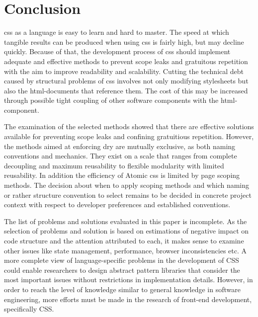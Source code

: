 
\chapter{Conclusion}
\gls{css} as a language is easy to learn and hard to master.
The speed at which tangible results can be produced when using \gls{css} is fairly high, but may decline quickly.
Because of that, the development process of \gls{css} should implement adequate and effective methods to prevent scope leaks and gratuitous repetition with the aim to improve readability and scalability.
Cutting the technical debt caused by structural problems of \gls{css} involves not only modifying stylesheets but also the \gls{html}-documents that reference them.
The cost of this may be increased through possible tight coupling of other software components with the \gls{html}-component.

The examination of the selected methods showed that there are effective solutions available for preventing scope leaks and confining gratuitious repetition.
However, the methods aimed at enforcing \gls{dry} are mutually exclusive, as both naming conventions and mechanics.
They exist on a scale that ranges from complete decoupling and maximum reusability to flexible modularity with limited reusability.
In addition the efficiency of Atomic \gls{css} is limited by page scoping methods.
The decision about when to apply scoping methods and which naming or rather structure convention to select remains to be decided in concrete project context with respect to developer preferences and established conventions.

The list of problems and solutions evaluated in this paper is incomplete.
As the selection of problems and solution is based on estimations of negative impact on code structure and the attention attributed to each, it makes sense to examine other issues like state management, performance, browser inconsistencies etc.
A more complete view of language-specific problems in the development of CSS could enable researchers to design abstract pattern libraries that consider the most important issues without restrictions in implementation details.
However, in order to reach the level of knowledge similar to general knowledge in software engineering, more efforts must be made in the research of front-end development, specifically CSS.
